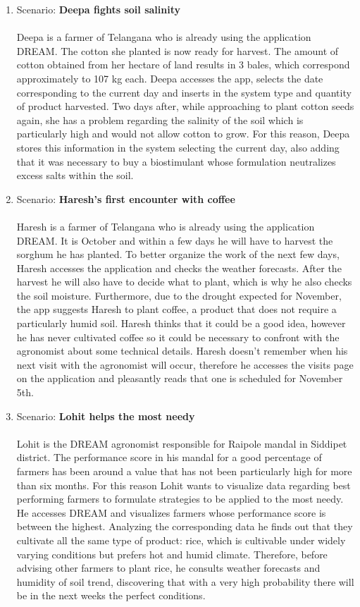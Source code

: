 \begin{enumerate}
\item Scenario: \textbf{Deepa fights soil salinity}\\\\
Deepa is a farmer of Telangana who is already using the application DREAM. The cotton she planted is now ready for harvest. The amount of cotton obtained from her hectare of land results in 3 bales, which correspond approximately to 107 kg each. Deepa accesses the app, selects the date corresponding to the current day and inserts in the system type and quantity of product harvested. Two days after, while approaching to plant cotton seeds again, she has a problem regarding the salinity of the soil which is particularly high and would not allow cotton to grow. For this reason, Deepa stores this information in the system selecting the current day, also adding that it was necessary to buy a biostimulant whose formulation neutralizes excess salts within the soil.
\\

\item Scenario: \textbf{Haresh's first encounter with coffee}\\\\
Haresh is a farmer of Telangana who is already using the application DREAM. It is October and within a few days he will have to harvest the sorghum he has planted. To better organize the work of the next few days, Haresh accesses the application and checks the weather forecasts. After the harvest he will also have to decide what to plant, which is why he also checks the soil moisture. Furthermore, due to the drought expected for November, the app suggests Haresh to plant coffee, a product that does not require a particularly humid soil. Haresh thinks that it could be a good idea, however he has never cultivated coffee so it could be necessary to confront with the agronomist about some technical details. Haresh doesn't remember when his next visit with the agronomist will occur, therefore he accesses the visits page on the application and pleasantly reads that one is scheduled for November 5th.
\\

\item Scenario: \textbf{Lohit helps the most needy}\\\\
Lohit is the DREAM agronomist responsible for Raipole mandal in Siddipet district. The performance score in his mandal for a good percentage of farmers has been around a value that has not been particularly high for more than six months. For this reason Lohit wants to visualize data regarding best performing farmers to formulate strategies to be applied to the most needy. He accesses DREAM and visualizes farmers whose performance score is between the highest. Analyzing the corresponding data he finds out that they cultivate all the same type of product: rice, which is cultivable under widely varying conditions but prefers hot and humid climate. Therefore, before advising other farmers to plant rice, he consults weather forecasts and humidity of soil trend, discovering that with a very high probability there will be in the next weeks the perfect conditions.
\\

\end{enumerate}

\newpage